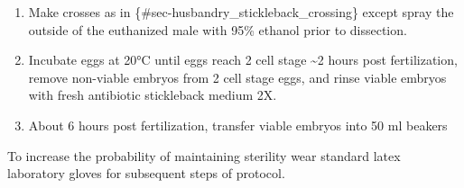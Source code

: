 \documentclass[
  letterpaper,
  DIV=11,
  numbers=noendperiod]{scrreprt}
\providecommand{\tightlist}{%
  \setlength{\itemsep}{0pt}\setlength{\parskip}{0pt}}\usepackage{longtable,booktabs,array}
\begin{document}
\begin{enumerate}
\def\labelenumi{\arabic{enumi}.}
\tightlist
\item
  Make crosses as in \{\#sec-husbandry\_stickleback\_crossing\} except
  spray the outside of the euthanized male with 95\% ethanol prior to
  dissection.
\item
  Incubate eggs at 20°C until eggs reach 2 cell stage \textasciitilde2
  hours post fertilization, remove non-viable embryos from 2 cell stage
  eggs, and rinse viable embryos with fresh antibiotic stickleback
  medium 2X.
\item
  About 6 hours post fertilization, transfer viable embryos into 50 ml
  beakers
\end{enumerate}

\begin{tcolorbox}[enhanced jigsaw, bottomtitle=1mm, rightrule=.15mm, toptitle=1mm, opacitybacktitle=0.6, bottomrule=.15mm, titlerule=0mm, coltitle=black, leftrule=.75mm, arc=.35mm, colback=white, colframe=quarto-callout-note-color-frame, left=2mm, colbacktitle=quarto-callout-note-color!10!white, title=\textcolor{quarto-callout-note-color}{\faInfo}\hspace{0.5em}{NOTES}, toprule=.15mm, opacityback=0, breakable]

To increase the probability of maintaining sterility wear standard latex
laboratory gloves for subsequent steps of protocol.

\end{tcolorbox}
\end{document}
